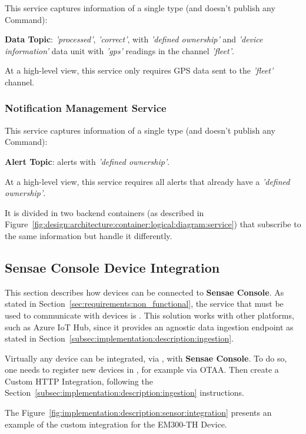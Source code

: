 This service captures information of a single type (and doesn't publish any Command):

\textbf{Data Topic}: \textit{'processed'}, \textit{'correct'}, with \textit{'defined ownership'} and \textit{'device information'} data unit with \textit{'gps'} readings in the channel \textit{'fleet'}.

At a high-level view, this service only requires \gls{GPS} data sent to the \textit{'fleet'} channel.

\subsubsection{Notification Management Service}
\label{subsubsec:implementation:description:services:notification}

This service captures information of a single type (and doesn't publish any Command):

\textbf{Alert Topic}: alerts with \textit{'defined ownership'}.

At a high-level view, this service requires all alerts that already have a \textit{'defined ownership'}.

It is divided in two backend containers (as described in Figure~\ref{fig:design:architecture:container:logical:diagram:service}) that subscribe to the same information but handle it differently.

\subsection{Sensae Console Device Integration}
\label{subsec:implementation:description:sensor}

This section describes how devices can be connected to \textbf{Sensae Console}. As stated in Section~\ref{sec:requirements:non_functional}, the service that must be used to communicate with devices is . This solution works with other platforms, such as Azure IoT Hub, since it provides an agnostic data ingestion endpoint as stated in Section~\ref{subsec:implementation:description:ingestion}.

Virtually any device can be integrated, via , with \textbf{Sensae Console}. To do so, one needs to register new devices in , for example via \gls{OTAA}. Then create a Custom HTTP Integration, following the Section~\ref{subsec:implementation:description:ingestion} instructions.

The Figure~\ref{fig:implementation:description:sensor:integration} presents an example of the custom integration for the EM300-TH Device.


